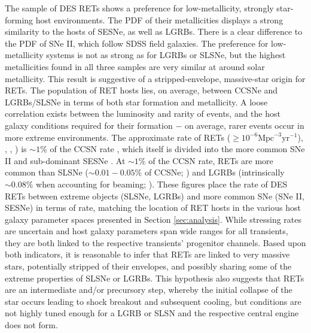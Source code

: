 \documentclass[fleqn,usenatbib,]{mnras}
\begin{document}
The sample of DES RETs shows a preference for low-metallicity, strongly star-forming host environments. The PDF of their metallicities displays a strong similarity to the hosts of SESNe, as well as LGRBs. There is a clear difference to the PDF of SNe II, which follow SDSS field galaxies. The preference for low-metallicity systems is not as strong as for LGRBs or SLSNe, but the highest metallicities found in all three samples are very similar at around solar metallicity. This result is suggestive of a stripped-envelope, massive-star origin for RETs. 
The population of RET hosts lies, on average, between CCSNe and LGRBs/SLSNe in terms of both star formation and metallicity. A loose correlation exists between the luminosity and rarity of events, and the host galaxy conditions required for their formation $-$ on average, rarer events occur in more extreme environments. The approximate rate of RETs ($\geq 10^{-6} \mathrm{Mpc}^{-3} \mathrm{yr}^{-1}$), \citealt{Drout2014}, , \citealt{Tampo2020}) is $\sim1\%$ of the CCSN rate \citep{Li2011,Horiuchi2011,Strolger2015}, which itself is divided into the more common SNe II and sub-dominant SESNe \citep{Kelly2012,Frohmaier2020}. At $\sim1\%$ of the CCSN rate, RETs are more common than SLSNe ($\sim0.01 - 0.05\%$ of CCSNe; \citealt{McCrum2015,Prajs2017,Frohmaier2020}) and LGRBs (intrinsically $\sim0.08\%$ when accounting for beaming; \citealt{Graham2016}). These figures place the rate of DES RETs between extreme objects (SLSNe, LGRBs) and more common SNe (SNe II, SESNe) in terms of rate, matching the location of RET hosts in the various host galaxy parameter spaces presented in Section \ref{sec:analysis}. While stressing rates are uncertain and host galaxy parameters span wide ranges for all transients, they are both linked to the respective transients' progenitor channels. Based upon both indicators, it is reasonable to infer that RETs are linked to very massive stars, potentially stripped of their envelopes, and possibly sharing some of the extreme properties of SLSNe or LGRBs. This hypothesis also suggests that RETs are an intermediate and/or precursory step, whereby the initial collapse of the star occurs leading to shock breakout and subsequent cooling, but conditions are not highly tuned enough for a LGRB or SLSN and the respective central engine does not form. 
\end{document}
